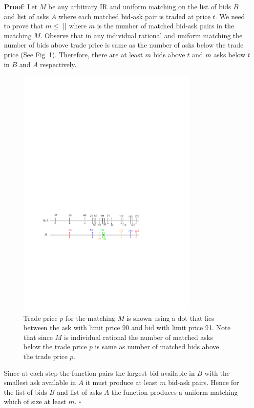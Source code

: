 \documentclass[a4paper,UKenglish,cleveref, autoref]{lipics-v2019}
\begin{document}
\textbf{Proof}: Let $M$ be any arbitrary IR and uniform matching on the list of bids $B$ and list of asks $A$ where each matched bid-ask pair is traded at price $t$. We need to prove that $m \leq$ || where $m$ is the number of matched bid-ask pairs in the matching $M$. Observe that in any individual rational and uniform matching the number of bids above  trade price is same as the number of asks below the trade price (See Fig~\ref{fig:UM_match}). Therefore, there are at least $m$ bids above $t$ and $m$ asks below $t$ in $B$ and $A$ respectively. 

\begin{figure}[h!]
\centering
\includegraphics[width=0.8\textwidth]{UM_matching.pdf}
\caption{ Trade price $p$ for the matching $M$ is shown using a dot that lies between the ask with limit price 90 and bid with limit price 91. Note that since $M$ is individual rational the number of matched asks below the trade price $p$ is same as number of matched bids above the trade price $p$. }
\label{fig:UM_match}
\end{figure}

Since at each step the function   pairs the largest bid available in $B$ with the smallest ask available in $A$ it must produce  at least $m$ bid-ask pairs. Hence for the list of bids $B$ and list of asks $A$ the function  produces a uniform matching which of size at least $m$. $\square$
\end{document}
